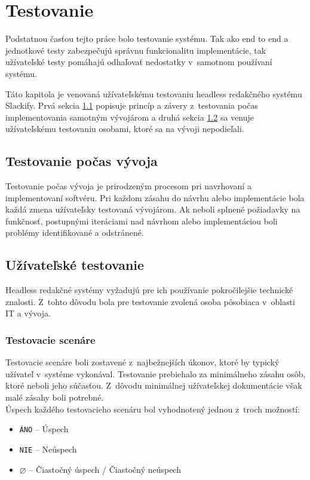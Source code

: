 \chapter{Testovanie}
\label{test}
Podstatnou časťou tejto práce bolo testovanie systému. Tak ako end to end a jednotkové testy zabezpečujú správnu funkcionalitu implementácie, tak užívateľské testy pomáhajú odhaľovať nedostatky v~samotnom používaní systému.

Táto kapitola je venovaná užívateľskému testovaniu headless redakčného systému Slackify. Prvá sekcia \ref{test:dev} popisuje princíp a závery z~testovania počas implementovania samotným vývojárom a druhá sekcia \ref{test:user} sa venuje užívateľskému testovaniu osobami, ktoré sa na vývoji nepodieľali.

\section{Testovanie počas vývoja}
\label{test:dev}
Testovanie počas vývoja je prirodzeným procesom pri navrhovaní a implementovaní softvéru. Pri každom zásahu do návrhu alebo implementácie bola každá zmena užívateľsky testovaná vývojárom. Ak neboli splnené požiadavky na funkčnosť, postupnými iteráciami nad návrhom alebo implementáciou boli problémy identifikované a odstránené.

\section{Užívateľské testovanie}
\label{test:user}
Headless redakčné systémy vyžadujú pre ich používanie pokročilejšie technické znalosti. Z~tohto dôvodu bola pre testovanie zvolená osoba pôsobiaca v~oblasti IT a vývoja.

\subsection{Testovacie scenáre}
Testovacie scenáre boli zostavené z~najbežnejších úkonov, ktoré by typický užívateľ v~systéme vykonával. Testovanie prebiehalo za minimálneho zásahu osôb, ktoré neboli jeho súčasťou. Z~dôvodu minimálnej užívateľskej dokumentácie však malé zásahy boli potrebné. \\

\noindent Úspech každého testovacieho scenáru bol vyhodnotený jednou z~troch možností:

\begin{itemize}
	\item \texttt{ÁNO} -- Úspech
	\item \texttt{NIE} -- Neúspech
	\item \texttt{$\varnothing$} -- Čiastočný úspech / Čiastočný neúspech
\end{itemize}

